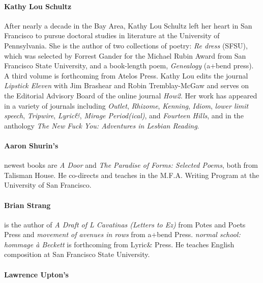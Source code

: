 \documentclass[
]{memoir}
\begin{document}
\hypertarget{kathy-lou-schultz}{%
\paragraph{Kathy Lou Schultz}\label{kathy-lou-schultz}}

After nearly a decade in the Bay Area, Kathy Lou Schultz left her heart
in San Francisco to pursue doctoral studies in literature at the
University of Pennsylvania. She is the author of two collections of
poetry: \emph{Re dress} (SFSU), which was selected by Forrest Gander for
the Michael Rubin Award from San Francisco State University, and a
book-length poem, \emph{Genealogy} (a+bend press). A third volume is
forthcoming from Atelos Press. Kathy Lou edits the journal
\emph{Lipstick Eleven} with Jim Brashear and Robin Tremblay-McGaw and
serves on the Editorial Advisory Board of the online journal
\emph{How2}. Her work has appeared in a variety of journals including
\emph{Outlet}, \emph{Rhizome}, \emph{Kenning}, \emph{Idiom}, \emph{lower
limit speech}, \emph{Tripwire}, \emph{Lyric\&}, \emph{Mirage
Period(ical)}, and \emph{Fourteen Hills}, and in the anthology \emph{The
New Fuck You: Adventures in Lesbian Reading}.

\hypertarget{aaron-shurins}{%
\paragraph{Aaron Shurin's}\label{aaron-shurins}}

newest books are \emph{A Door} and \emph{The Paradise of Forms: Selected
Poems}, both from Talisman House. He co-directs and teaches in the
M.F.A. Writing Program at the University of San Francisco.

\hypertarget{brian-strang}{%
\paragraph{Brian Strang}\label{brian-strang}}

is the author of \emph{A Draft of L Cavatinas (Letters to Ez)} from
Potes and Poets Press and \emph{movement of avenues in rows} from a+bend
Press. \emph{normal school: hommage à Beckett} is forthcoming from
Lyric\& Press. He teaches English composition at San Francisco State
University.

\hypertarget{lawrence-uptons}{%
\paragraph{Lawrence Upton's}\label{lawrence-uptons}}
\end{document}
